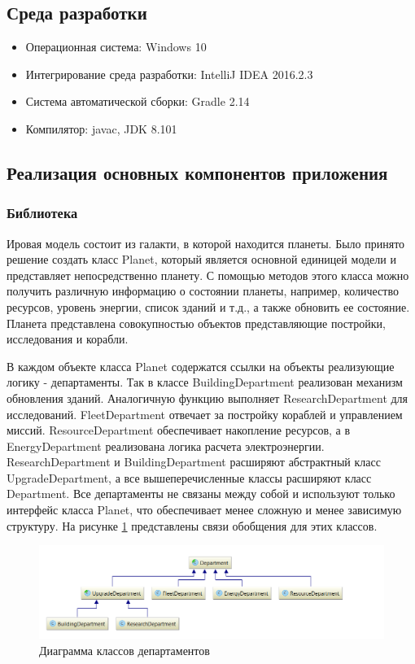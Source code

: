 \subsection{Среда разработки}

\begin{itemize}
	\item Операционная система: Windows 10
	\item Интегрирование среда разработки: IntelliJ IDEA 2016.2.3
	\item Система автоматической сборки: Gradle 2.14
	\item Компилятор: javac, JDK 8.101
\end{itemize}

\subsection{Реализация основных компонентов приложения}

\subsubsection{Библиотека}

Ировая модель состоит из галакти, в которой находится планеты. Было принято решение создать класс Planet, который является основной единицей модели и представляет непосредственно планету. С помощью методов этого класса можно получить различную информацию о состоянии планеты, например, количество ресурсов, уровень энергии, список зданий и т.д., а также обновить ее состояние. Планета представлена совокупностью объектов представляющие постройки, исследования и корабли.

В каждом объекте класса Planet содержатся ссылки на объекты реализующие логику - департаменты. Так в классе BuildingDepartment реализован механизм обновления зданий. Аналогичную функцию выполняет ResearchDepartment для исследований. FleetDepartment отвечает за постройку кораблей и управлением миссий. ResourceDepartment обеспечивает накопление ресурсов, а в EnergyDepartment  реализована логика расчета электроэнергии. ResearchDepartment и BuildingDepartment расширяют абстрактный класс UpgradeDepartment, а все вышеперечисленные классы расширяют класс Department. Все департаменты не связаны между собой и используют только интерфейс класса Planet, что обеспечивает менее сложную и менее зависимую структуру. На рисунке \ref{pic:d1} представлены связи обобщения для этих классов.

\begin{figure}[H]
\centering
\includegraphics[scale=0.5]{d1.png}
\caption{Диаграмма классов  департаментов}
\label{pic:d1}
\end{figure}


